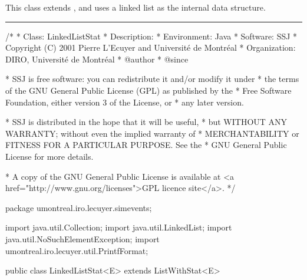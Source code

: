 
This class extends , and
uses a linked list as the internal data structure.


\bigskip\hrule


\begin{code}
\begin{hide}
/*
 * Class:        LinkedListStat
 * Description:  
 * Environment:  Java
 * Software:     SSJ 
 * Copyright (C) 2001  Pierre L'Ecuyer and Université de Montréal
 * Organization: DIRO, Université de Montréal
 * @author       
 * @since

 * SSJ is free software: you can redistribute it and/or modify it under
 * the terms of the GNU General Public License (GPL) as published by the
 * Free Software Foundation, either version 3 of the License, or
 * any later version.

 * SSJ is distributed in the hope that it will be useful,
 * but WITHOUT ANY WARRANTY; without even the implied warranty of
 * MERCHANTABILITY or FITNESS FOR A PARTICULAR PURPOSE.  See the
 * GNU General Public License for more details.

 * A copy of the GNU General Public License is available at
   <a href="http://www.gnu.org/licenses">GPL licence site</a>.
 */
\end{hide}
package umontreal.iro.lecuyer.simevents;
\begin{hide}
import java.util.Collection;
import java.util.LinkedList;
import java.util.NoSuchElementException;
import umontreal.iro.lecuyer.util.PrintfFormat;
\end{hide}

public class LinkedListStat<E> extends ListWithStat<E>\begin{hide} {
\end{hide}\end{code}

